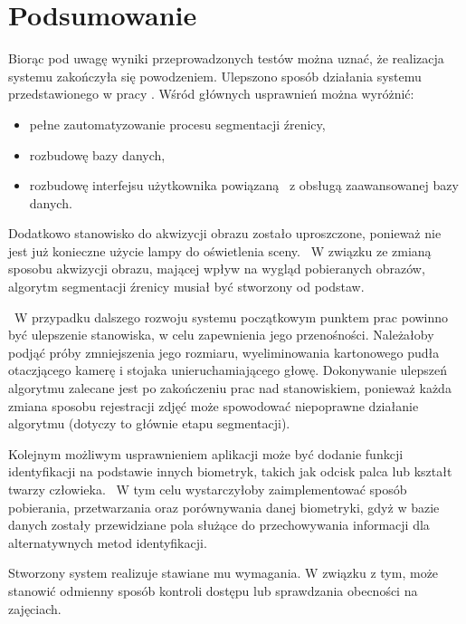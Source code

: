 \chapter{Podsumowanie}
\label{cha:podsumowanie}

Biorąc pod uwagę wyniki przeprowadzonych testów można uznać, że realizacja systemu zakończyła się powodzeniem. Ulepszono sposób działania systemu przedstawionego w pracy \cite{Gl11}. Wśród głównych usprawnień można wyróżnić:
\begin{itemize}
\item pełne zautomatyzowanie procesu segmentacji źrenicy,
\item rozbudowę bazy danych,
\item rozbudowę interfejsu użytkownika powiązaną ~z obsługą zaawansowanej bazy danych.
\end{itemize}

Dodatkowo stanowisko do akwizycji obrazu zostało uproszczone, ponieważ nie jest już konieczne użycie lampy do oświetlenia sceny. ~W związku ze zmianą sposobu akwizycji obrazu, mającej wpływ na wygląd pobieranych obrazów, algorytm segmentacji źrenicy musiał być stworzony od podstaw. 

~W przypadku dalszego rozwoju systemu początkowym punktem prac powinno być ulepszenie stanowiska, w celu zapewnienia jego przenośności. Należałoby podjąć próby zmniejszenia jego rozmiaru, wyeliminowania kartonowego pudła otaczjącego kamerę i stojaka unieruchamiającego głowę. Dokonywanie ulepszeń algorytmu zalecane jest po zakończeniu prac nad stanowiskiem, ponieważ każda zmiana sposobu rejestracji zdjęć może spowodować niepoprawne działanie algorytmu (dotyczy to głównie etapu segmentacji).

Kolejnym możliwym usprawnieniem aplikacji może być dodanie funkcji identyfikacji na podstawie innych biometryk, takich jak odcisk palca lub kształt twarzy człowieka. ~W tym celu wystarczyłoby zaimplementować sposób pobierania, przetwarzania oraz porównywania danej biometryki, gdyż w bazie danych zostały przewidziane pola służące do przechowywania informacji dla alternatywnych metod identyfikacji.

Stworzony system realizuje stawiane mu wymagania. W związku z tym, może stanowić odmienny sposób kontroli dostępu lub sprawdzania obecności na zajęciach.
